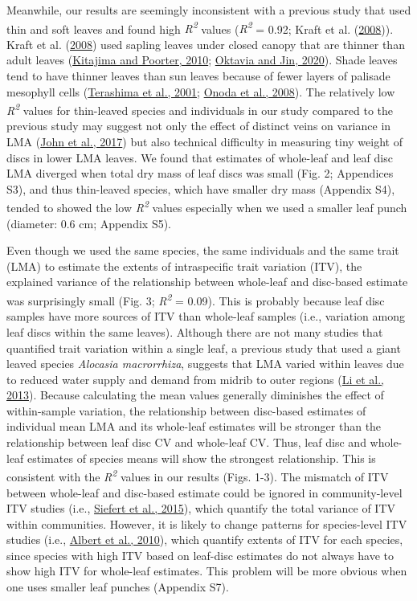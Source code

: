 \documentclass[
  12pt,
  a4paper,
,tablecaptionabove
]{scrartcl}
\begin{document}
Meanwhile, our results are seemingly inconsistent with a previous study that used thin and soft leaves and found high \emph{R\textsuperscript{2}} values (\emph{R\textsuperscript{2}} = 0.92; Kraft et al. (\protect\hyperlink{ref-Kraft2008}{2008})).
Kraft et al. (\protect\hyperlink{ref-Kraft2008}{2008}) used sapling leaves under closed canopy that are thinner than adult leaves (\protect\hyperlink{ref-Kitajima2010}{Kitajima and Poorter, 2010}; \protect\hyperlink{ref-Oktavia2020}{Oktavia and Jin, 2020}).
Shade leaves tend to have thinner leaves than sun leaves because of fewer layers of palisade mesophyll cells (\protect\hyperlink{ref-Terashima2001}{Terashima et al., 2001}; \protect\hyperlink{ref-Onoda2008}{Onoda et al., 2008}).
The relatively low \emph{R\textsuperscript{2}} values for thin-leaved species and individuals in our study compared to the previous study may suggest not only the effect of distinct veins on variance in LMA (\protect\hyperlink{ref-John2017}{John et al., 2017}) but also technical difficulty in measuring tiny weight of discs in lower LMA leaves.
We found that estimates of whole-leaf and leaf disc LMA diverged when total dry mass of leaf discs was small (Fig. 2; Appendices S3), and thus thin-leaved species, which have smaller dry mass (Appendix S4), tended to showed the low \emph{R\textsuperscript{2}} values especially when we used a smaller leaf punch (diameter: 0.6 cm; Appendix S5).

Even though we used the same species, the same individuals and the same trait (LMA) to estimate the extents of intraspecific trait variation (ITV), the explained variance of the relationship between whole-leaf and disc-based estimate was surprisingly small (Fig. 3; \emph{R\textsuperscript{2}} = 0.09).
This is probably because leaf disc samples have more sources of ITV than whole-leaf samples (i.e., variation among leaf discs within the same leaves).
Although there are not many studies that quantified trait variation within a single leaf, a previous study that used a giant leaved species \emph{Alocasia macrorrhiza}, suggests that LMA varied within leaves due to reduced water supply and demand from midrib to outer regions (\protect\hyperlink{ref-Li2013a}{Li et al., 2013}).
Because calculating the mean values generally diminishes the effect of within-sample variation, the relationship between disc-based estimates of individual mean LMA and its whole-leaf estimates will be stronger than the relationship between leaf disc CV and whole-leaf CV.
Thus, leaf disc and whole-leaf estimates of species means will show the strongest relationship.
This is consistent with the \emph{R\textsuperscript{2}} values in our results (Figs. 1-3).
The mismatch of ITV between whole-leaf and disc-based estimate could be ignored in community-level ITV studies (i.e., \protect\hyperlink{ref-Siefert2015}{Siefert et al., 2015}), which quantify the total variance of ITV within communities.
However, it is likely to change patterns for species-level ITV studies (i.e., \protect\hyperlink{ref-Albert2010a}{Albert et al., 2010}), which quantify extents of ITV for each species, since species with high ITV based on leaf-disc estimates do not always have to show high ITV for whole-leaf estimates.
This problem will be more obvious when one uses smaller leaf punches (Appendix S7).
\end{document}
